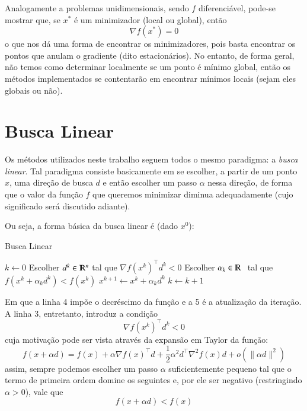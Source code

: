 \documentclass[a4paper,11pt]{article}
\begin{document}
        Analogamente a problemas unidimensionais, sendo $f$ diferenciável, pode-se mostrar \citep*{Nocedal2006NO} que, se $x^*$ é um minimizador
        (local ou global), então
            $$ \nabla f(x^*) = 0 $$
        o que nos dá uma forma de encontrar os minimizadores, pois basta encontrar os pontos que anulam o gradiente (dito estacionários).
        No entanto, de forma geral, não temos como determinar localmente se um ponto é mínimo global, então os métodos implementados se contentarão
        em encontrar mínimos locais (sejam eles globais ou não).

    \newpage
    \section*{Busca Linear}
        Os métodos utilizados neste trabalho seguem todos o mesmo paradigma: a \emph{busca linear}.
        Tal paradigma consiste basicamente em se escolher, a partir de um ponto $x$, uma direção de busca $d$ e então escolher
        um passo $\alpha$ nessa direção, de forma que o valor da função $f$ que queremos
        minimizar diminua adequadamente (cujo significado será discutido adiante).

        Ou seja, a forma básica da busca linear é (dado $x^0$):
        \begin{algorithm}[h]
            \caption{Busca Linear}
            \label{alg:ls}
            \begin{algorithmic}[1]
                \State $k \gets 0$
                    \State Escolher $d^k \in \varmathbb{R}^n$ tal que $\nabla f(x^k)^\top d^k < 0$
                    \State Escolher $\alpha_k \in \varmathbb{R}$\,\, tal que $f(x^k + \alpha_k d^k) < f(x^k)$
                    \State $x^{k+1} \gets x^k + \alpha_k d^k$
                    \State $k \gets k + 1$
                \EndWhile
            \end{algorithmic}
        \end{algorithm}

        Em que a linha 4 impõe o decréscimo da função e a 5 é a atualização da iteração.
        A linha 3, entretanto, introduz a condição
        \begin{equation}
            \label{eq:desc}
            \nabla f(x^k)^\top d^k < 0
        \end{equation}
        cuja motivação pode ser vista através da expansão em Taylor da função:
            $$ f(x + \alpha d) = f(x) + \alpha\nabla f(x)^\top d + \frac{1}{2}\alpha^2d^\top\nabla^2 f(x)d + o(\|\alpha d\|^2)  $$
        assim, sempre podemos escolher um passo $\alpha$ suficientemente pequeno tal que o termo de primeira ordem domine os seguintes
        e, por ele ser negativo (restringindo $\alpha > 0$), vale que
            $$ f(x + \alpha d) < f(x) $$
\end{document}
